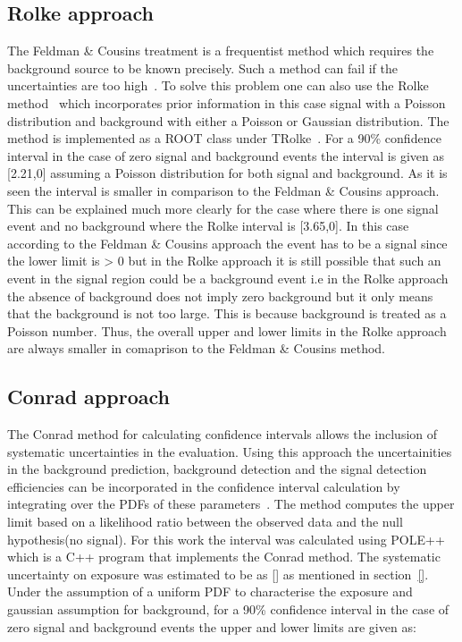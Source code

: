 \subsection{Rolke approach}
\label{subsec:Rolke}
The Feldman \& Cousins treatment is a frequentist method which requires the background source to be known precisely. Such a method can fail if the uncertainties are too high~\cite{}. To solve this problem one can also use the Rolke method~\cite{} which incorporates prior information in this case signal with a Poisson distribution and background with either a Poisson or Gaussian distribution. The method is implemented as a ROOT class under TRolke~\cite{}. For a 90\% confidence interval in the case of zero signal and background events the interval is given as [2.21,0] assuming a Poisson distribution for both signal and background. As it is seen the interval is smaller in comparison to the Feldman \& Cousins approach. This can be explained much more clearly for the case where there is one signal event and no background where the Rolke interval is [3.65,0]. In this case according to the Feldman \& Cousins approach the event has to be a signal since the lower limit is > 0 but in the Rolke approach it is still possible that such an event in the signal region could be a background event i.e in the Rolke approach the absence of background does not imply zero background but it only means that the background is not too large. This is because background is treated as a Poisson number. Thus, the overall upper and lower limits in the Rolke approach are always smaller in comaprison to the Feldman \& Cousins  method. 

\subsection{Conrad approach}
\label{subsec:Conrad}
The Conrad method for calculating confidence intervals allows the inclusion of systematic uncertainties in the evaluation. Using this approach the uncertainities in the background prediction, background detection and the signal detection efficiencies can be incorporated in the confidence interval calculation by integrating over the PDFs of these parameters~\cite{}. The method computes the upper limit based on a likelihood ratio between the observed data and the null hypothesis(no signal). For this work the interval was calculated using POLE++~\cite{} which is a C++ program that implements the Conrad method. The systematic uncertainty on exposure was estimated to be as [] as mentioned in section~\ref{}. Under the assumption of a uniform PDF to characterise the exposure and gaussian assumption for background, for a 90\% confidence interval in the case of zero signal and background events the upper and lower limits are given as: 

